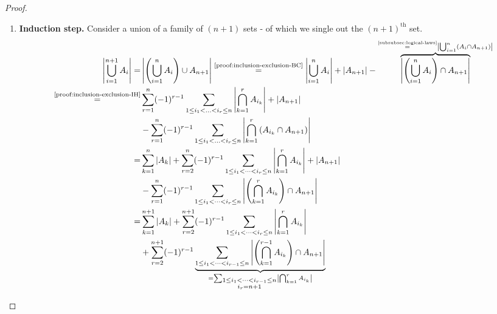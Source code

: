 \begin{proof}
\begin{enumerate}[partopsep=0em, topsep=0em, label=(\roman*)]
\item \textbf{Induction step.} \label{proof:inclusion-exclusion-IS}
Consider a union of a family of $(n+1)$ sets - of which we single out the $(n+1)^\text{th}$ set.
\vspace{-\baselineskip}
\begin{align}
\left|\bigcup_{i=1}^{n+1} A_i\right| = & \left|\left(\bigcup_{i=1}^n A_i\right) \cup A_{n+1}\right| \overset{\text{\ref{proof:inclusion-exclusion-BC}}}{=} \left|\bigcup_{i=1}^n A_i\right|+\left|A_{n+1}\right|-\overbrace{\left|\left(\bigcup_{i=1}^n A_i\right) \cap A_{n+1}\right|}^{\overset{\text{\ref{subsubsec:logical-laws}}}{=}\left|\bigcup_{i=1}^n\left(A_i \cap A_{n+1}\right)\right|} \label{eq:inclusion_exclusion:step1} \\
\overset{\text{\ref{proof:inclusion-exclusion-IH}}}{=} & \sum_{r=1}^n(-1)^{r-1} \sum_{1 \leq i_1<\ldots<i_r \leq n}\left|\bigcap_{k=1}^r A_{i_k}\right|+\left|A_{n+1}\right| \notag \\
& -\sum_{r=1}^n(-1)^{r-1} \sum_{1 \leq i_1<\ldots<i_r \leq n}\left|\bigcap_{k=1}^r\left(A_{i_k} \cap A_{n+1}\right)\right| \label{eq:inclusion_exclusion:step2} \\
= & \sum_{k=1}^{n}\left|A_k\right| +\sum_{r=2}^{n} (-1)^{r-1} \sum_{1\le i_1<\dots<i_r\le n} \left|\bigcap_{k=1}^r A_{i_k}\right| +\left|A_{n+1}\right| \notag \\
& -\sum_{r=1}^{n} (-1)^{r-1} \sum_{1\le i_1<\dots<i_{r}\le n} \left|\left(\bigcap_{k=1}^{r} A_{i_k}\right)\cap A_{n+1}\right| \label{eq:inclusion_exclusion:step3} \\
= & \sum_{k=1}^{n+1}\left|A_k\right| +\sum_{r=2}^{n+1} (-1)^{r-1} \sum_{1\le i_1<\dots<i_r\le n} \left|\bigcap_{k=1}^r A_{i_k}\right| \notag \\
& + \sum_{r=2}^{n+1} (-1)^{r-1} \underbrace{\sum_{1\le i_1<\dots<i_{r-1}\le n} \left| \left( \bigcap_{k=1}^{r-1} A_{i_k} \right) \cap A_{n+1}\right|}_{ = \sum_{\substack{1 \le i_1 < \dots < i_{r-1} \le n\\ i_r = n+1}} \left|\bigcap\nolimits_{k=1}^{r} A_{i_k}\right|} \label{eq:inclusion_exclusion:step4} \\

\end{align}
\end{enumerate}
\end{proof}
